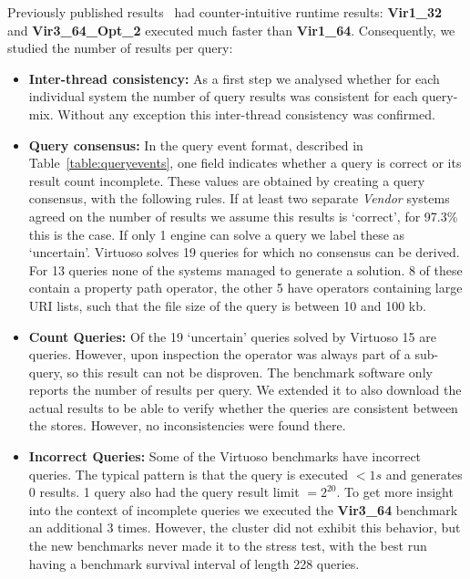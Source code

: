 Previously published results~\cite{dewitte_swat4ls_2016} had counter-intuitive runtime results:  \textbf{ Vir1\_32} and \textbf{Vir3\_64\_Opt\_2} executed much faster than \textbf{Vir1\_64}. 
Consequently, we studied the number of results per query:

 
\begin{itemize}
	\item \textbf{Inter-thread consistency:} As a first step we analysed whether for each individual system the number of query results was consistent for each query-mix. 
	Without any exception this inter-thread consistency was confirmed.
	
	\item \textbf{Query consensus:} In the query event format, described in Table~\ref{table:queryevents}, one field indicates whether a query is correct or its result count incomplete. These values are obtained by creating a query consensus, with the following rules. If at least two separate \emph{Vendor} systems agreed on the number of results we assume this results is `correct', for 97.3\% this is the case. If only 1 engine can solve a query we label these as `uncertain'. Virtuoso solves 19 queries for which no consensus can be derived. For 13 queries none of the systems managed to generate a solution. 8 of these contain a property path operator, the other 5 have  operators containing large URI lists, such that the file size of the query is between 10 and 100 kb.
	
	\item \textbf{Count Queries:} Of the 19 `uncertain' queries solved by Virtuoso 15 are  queries. However, upon inspection the  operator was always part of a sub-query, so this result can not be disproven. The benchmark software only reports the number of results per query. We extended it to also download the actual results to be able to verify whether the  queries are consistent between the stores. However, no inconsistencies were found there.
	
	\item \textbf{Incorrect Queries:} Some of the Virtuoso benchmarks have incorrect queries. The typical pattern is that the query is executed $< 1s$ and generates 0 results. 1 query also had the query result limit $ = 2^{20}$. To get more insight into the context of incomplete queries we executed the \textbf{Vir3\_64} benchmark an additional 3 times. However, the cluster did not exhibit this behavior, but the new benchmarks never made it to the stress test, with the best run having a benchmark survival interval of length 228 queries.
\end{itemize}




